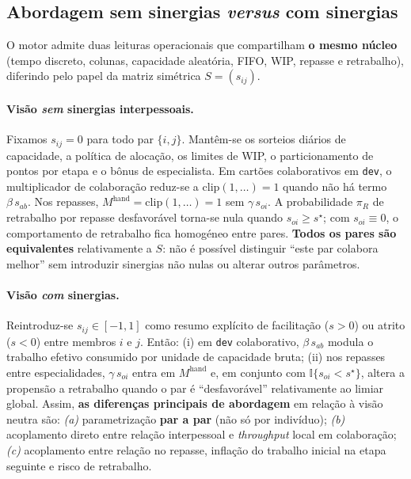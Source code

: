 \subsection{Abordagem sem sinergias \emph{versus} com sinergias}
\label{sec:sinergia-neutral-vs}

O motor admite duas leituras operacionais que compartilham \textbf{o mesmo núcleo} (tempo discreto, colunas, capacidade aleatória, FIFO, WIP, repasse e retrabalho), diferindo pelo papel da matriz simétrica $S=(s_{ij})$.

\paragraph{Visão \emph{sem} sinergias interpessoais.}
Fixamos $s_{ij}=0$ para todo par $\{i,j\}$. Mantêm-se os sorteios diários de capacidade, a política de alocação, os limites de WIP, o particionamento de pontos por etapa e o bônus de especialista. Em cartões colaborativos em \texttt{dev}, o multiplicador de colaboração reduz-se a $\mathrm{clip}(1,\ldots)=1$ quando não há termo $\beta\,s_{ab}$. Nos repasses, $M^{\text{hand}}=\mathrm{clip}(1,\ldots)=1$ sem $\gamma\,s_{oi}$. A probabilidade $\pi_R$ de retrabalho por repasse desfavorável torna-se nula quando $s_{oi}\ge s^\star$; com $s_{oi}\equiv 0$, o comportamento de retrabalho fica homogéneo entre pares. \textbf{Todos os pares são equivalentes} relativamente a $S$: não é possível distinguir ``este par colabora melhor'' sem introduzir sinergias não nulas ou alterar outros parâmetros.

\paragraph{Visão \emph{com} sinergias.}
Reintroduz-se $s_{ij}\in[-1,1]$ como resumo explícito de facilitação ($s>0$) ou atrito ($s<0$) entre membros $i$ e $j$. Então: (i) em \texttt{dev} colaborativo, $\beta\,s_{ab}$ modula o trabalho efetivo consumido por unidade de capacidade bruta; (ii) nos repasses entre especialidades, $\gamma\,s_{oi}$ entra em $M^{\text{hand}}$ e, em conjunto com $\mathbb{I}\{s_{oi}<s^\star\}$, altera a propensão a retrabalho quando o par é ``desfavorável'' relativamente ao limiar global. Assim, \textbf{as diferenças principais de abordagem} em relação à visão neutra são: \emph{(a)} parametrização \textbf{par a par} (não só por indivíduo); \emph{(b)} acoplamento direto entre relação interpessoal e \emph{throughput} local em colaboração; \emph{(c)} acoplamento entre relação no repasse, inflação do trabalho inicial na etapa seguinte e risco de retrabalho.

